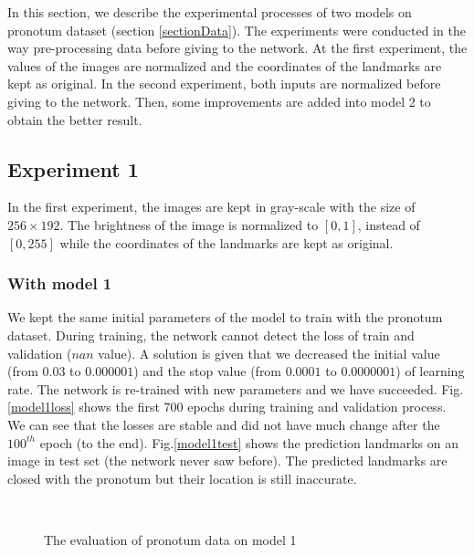 \documentclass[12pt,a4paper]{article}
\begin{document}
In this section, we describe the experimental processes of two models on pronotum dataset (section \ref{sectionData}). The experiments were conducted in the way pre-processing data before giving to the network. At the first experiment, the values of the images are normalized and the coordinates of the landmarks are kept as original. In the second experiment, both inputs are normalized before giving to the network. Then, some improvements are added into model 2 to obtain the better result.
\subsection{Experiment 1}
In the first experiment, the images are kept in gray-scale with the size of $256 \times 192$. The brightness of the image is normalized to $[0,1]$, instead of $[0,255]$ while the coordinates of the landmarks are kept as original. 
\subsubsection{With model 1}
We kept the same initial parameters of the model to train with the pronotum dataset. During training, the network cannot detect the loss of train and validation ($nan$ value). A solution is given that we decreased the initial value (from $0.03$ to $0.000001$) and the stop value (from $0.0001$ to $0.0000001$) of learning rate. The network is re-trained with new parameters and we have succeeded. Fig.\ref{model1loss} shows the first 700 epochs during training and validation process. We can see that the losses are stable and did not have much change after the $100^{th}$ epoch (to the end). Fig.\ref{model1test} shows the prediction landmarks on an image in test set (the network never saw before). The predicted landmarks are closed with the pronotum but their location is still inaccurate.
\begin{figure}[h!]
\centering
{}~~
\caption{The evaluation of pronotum data on model 1}
\label{model1tl}
\end{figure}
\end{document}
